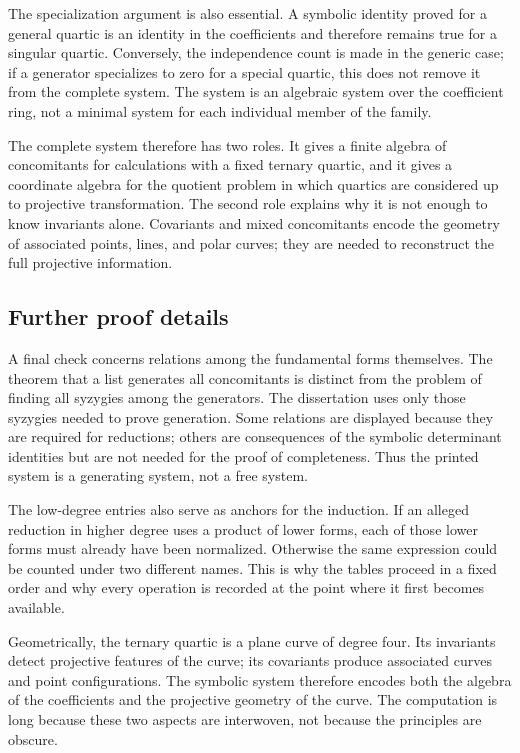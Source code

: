 \documentclass[11pt]{article}
\begin{document}
The specialization argument is also essential. A symbolic identity proved for a general quartic is
an identity in the coefficients and therefore remains true for a singular quartic. Conversely, the
independence count is made in the generic case; if a generator specializes to zero for a special
quartic, this does not remove it from the complete system. The system is an algebraic system over
the coefficient ring, not a minimal system for each individual member of the family.

The complete system therefore has two roles. It gives a finite algebra of concomitants for
calculations with a fixed ternary quartic, and it gives a coordinate algebra for the quotient
problem in which quartics are considered up to projective transformation. The second role explains
why it is not enough to know invariants alone. Covariants and mixed concomitants encode the geometry
of associated points, lines, and polar curves; they are needed to reconstruct the full projective
information.


\subsection{Further proof details}

A final check concerns relations among the fundamental forms themselves. The theorem that a list
generates all concomitants is distinct from the problem of finding all syzygies among the
generators. The dissertation uses only those syzygies needed to prove generation. Some relations are
displayed because they are required for reductions; others are consequences of the symbolic
determinant identities but are not needed for the proof of completeness. Thus the printed system is
a generating system, not a free system.

The low-degree entries also serve as anchors for the induction. If an alleged reduction in higher
degree uses a product of lower forms, each of those lower forms must already have been normalized.
Otherwise the same expression could be counted under two different names. This is why the tables
proceed in a fixed order and why every operation is recorded at the point where it first becomes
available.

Geometrically, the ternary quartic is a plane curve of degree four. Its invariants detect projective
features of the curve; its covariants produce associated curves and point configurations. The
symbolic system therefore encodes both the algebra of the coefficients and the projective geometry
of the curve. The computation is long because these two aspects are interwoven, not because the
principles are obscure.
\end{document}
